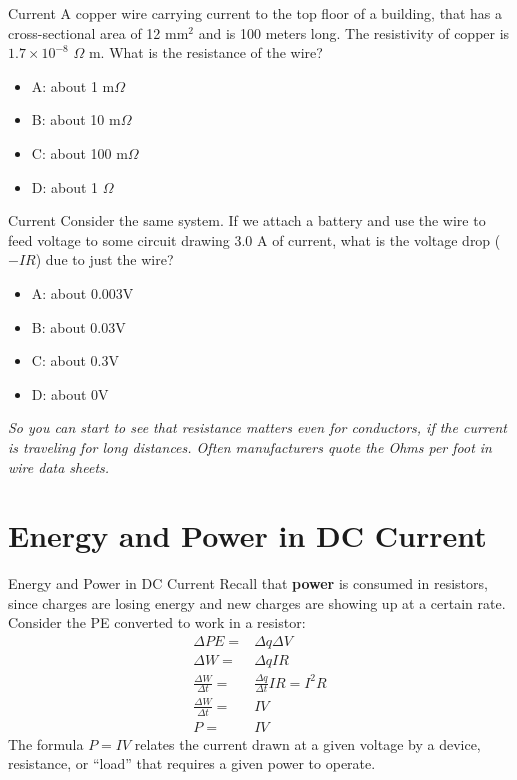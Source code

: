 \documentclass{beamer}
\begin{document}
\begin{frame}{Current}
A copper wire carrying current to the top floor of a building, that has a cross-sectional area of 12 mm$^2$ and is 100 meters long.  The resistivity of copper is $1.7 \times 10^{-8}$ $\Omega$ m.  What is the resistance of the wire?
\begin{itemize}
\item A: about 1 m$\Omega$
\item B: about 10 m$\Omega$
\item C: about 100 m$\Omega$
\item D: about 1 $\Omega$
\end{itemize}
\end{frame}

\begin{frame}{Current}
Consider the same system.  If we attach a battery and use the wire to feed voltage to some circuit drawing 3.0 A of current, what is the voltage drop ($-I R$) due to just the wire?
\begin{itemize}
\item A: about 0.003V
\item B: about 0.03V
\item C: about 0.3V
\item D: about 0V
\end{itemize}
\footnotesize
\textit{So you can start to see that resistance matters even for conductors, if the current is traveling for long distances.  Often manufacturers quote the Ohms per foot in wire data sheets.}
\end{frame}

\section{Energy and Power in DC Current}

\begin{frame}{Energy and Power in DC Current}
Recall that \textbf{power} is consumed in resistors, since charges are losing energy and new charges are showing up at a certain rate.  Consider the PE converted to work in a resistor:
\begin{align}
\Delta PE =& \Delta q\Delta V \\
\Delta W =& \Delta q I R \\
\frac{\Delta W}{\Delta t} =& \frac{\Delta q}{\Delta t} I R = I^2 R \\
\frac{\Delta W}{\Delta t} =& I V \\
P =& IV
\end{align}
The formula $P = IV$ relates the current drawn at a given voltage by a device, resistance, or ``load'' that requires a given power to operate.
\end{frame}
\end{document}
